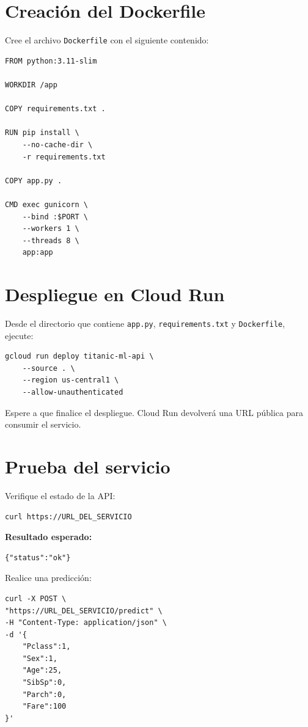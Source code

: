 \documentclass[
  coursetitle={Cómputo Nube y Tecnologías Emergentes},
  coursehours={96},
  coursedate={Verano 2026},
  doctype={Tutorial},
  otherlangs={english,french},
  authorname={Lázaro},
  authorsurname={Bustio-Martínez},
  authortitle={PhD},
  role={Profesor Investigador},
  email={lbustio@inaoe.mx},
  phone={5559504000},
  ext={7459},
  institution={Instituto Nacional de Astrofísica, Óptica y Electrónica (INAOE)},
  department={Maestría en Ciencias en Tecnologías de Seguridad},
  address={Luis Enrique Erro 1, Sta. Ma. Tonantzintla, San Andrés Cholula, CP 72840, Puebla, México},
  margin={0.5in}
]{../../lbustio_lecture_notes}
\begin{document}
\section{Creación del Dockerfile}

Cree el archivo \texttt{Dockerfile} con el siguiente contenido:

\begin{lstlisting}
FROM python:3.11-slim

WORKDIR /app

COPY requirements.txt .

RUN pip install \
    --no-cache-dir \
    -r requirements.txt

COPY app.py .

CMD exec gunicorn \
    --bind :$PORT \
    --workers 1 \
    --threads 8 \
    app:app
\end{lstlisting}

\section{Despliegue en Cloud Run}

Desde el directorio que contiene \texttt{app.py}, \texttt{requirements.txt} y \texttt{Dockerfile}, ejecute:

\begin{lstlisting}
gcloud run deploy titanic-ml-api \
    --source . \
    --region us-central1 \
    --allow-unauthenticated
\end{lstlisting}

Espere a que finalice el despliegue. Cloud Run devolverá una URL pública para consumir el servicio.

\section{Prueba del servicio}

Verifique el estado de la API:

\begin{lstlisting}
curl https://URL_DEL_SERVICIO
\end{lstlisting}

\textbf{Resultado esperado:}

\begin{lstlisting}
{"status":"ok"}
\end{lstlisting}

Realice una predicción:

\begin{lstlisting}
curl -X POST \
"https://URL_DEL_SERVICIO/predict" \
-H "Content-Type: application/json" \
-d '{
    "Pclass":1,
    "Sex":1,
    "Age":25,
    "SibSp":0,
    "Parch":0,
    "Fare":100
}'
\end{lstlisting}
\end{document}
